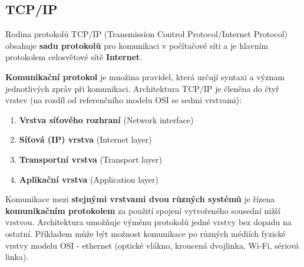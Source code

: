 \subsection{TCP/IP}
Rodina protokolů TCP/IP (Transmission Control Protocol/Internet Protocol) obsahuje \textbf{sadu protokolů} pro komunikaci v počítačové síti a je hlavním protokolem celosvětové sítě \textbf{Internet}. 

\textbf{Komunikační protokol} je množina pravidel, která určují syntaxi a význam jednotlivých zpráv při komunikaci. Architektura TCP/IP je členěna do čtyř vrstev (na rozdíl od referenčního modelu OSI se sedmi vrstvami):

\begin{enumerate}
	\item \textbf{Vrstva síťového rozhraní} (Network interface)
	\item \textbf{Síťová (IP) vrstva} (Internet layer)
	\item \textbf{Transportní vrstva} (Transport layer)
	\item \textbf{Aplikační vrstva }(Application layer)
\end{enumerate}

\noindent{}

Komunikace mezi \textbf{stejnými vrstvami dvou různých systémů} je řízena \textbf{komunikačním protokolem} za použití spojení vytvořeného sousední nižší vrstvou. Architektura umožňuje výměnu protokolů jedné vrstvy bez dopadu na ostatní. Příkladem může být možnost komunikace po různých médiích fyzické vrstvy modelu OSI - ethernet (optické vlákno, kroucená dvojlinka, Wi-Fi, sériová linka).


